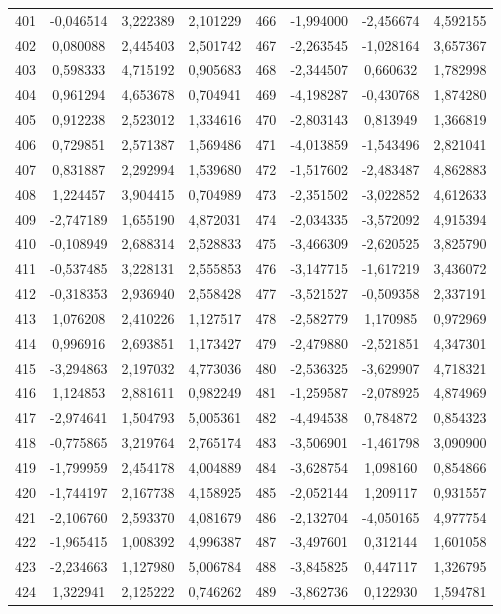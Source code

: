 \begin{apendicesenv}
\begin{table}[H]
\begin{tabular}{c c c c c c c c}
		401 & -0,046514 & 3,222389 & 2,101229 & 466 & -1,994000 & -2,456674 & 4,592155 \\
		402 & 0,080088 & 2,445403 & 2,501742 & 467 & -2,263545 & -1,028164 & 3,657367 \\
		403 & 0,598333 & 4,715192 & 0,905683 & 468 & -2,344507 & 0,660632 & 1,782998 \\
		404 & 0,961294 & 4,653678 & 0,704941 & 469 & -4,198287 & -0,430768 & 1,874280 \\
		405 & 0,912238 & 2,523012 & 1,334616 & 470 & -2,803143 & 0,813949 & 1,366819 \\
		406 & 0,729851 & 2,571387 & 1,569486 & 471 & -4,013859 & -1,543496 & 2,821041 \\
		407 & 0,831887 & 2,292994 & 1,539680 & 472 & -1,517602 & -2,483487 & 4,862883 \\
		408 & 1,224457 & 3,904415 & 0,704989 & 473 & -2,351502 & -3,022852 & 4,612633 \\
		409 & -2,747189 & 1,655190 & 4,872031 & 474 & -2,034335 & -3,572092 & 4,915394 \\
		410 & -0,108949 & 2,688314 & 2,528833 & 475 & -3,466309 & -2,620525 & 3,825790 \\
		411 & -0,537485 & 3,228131 & 2,555853 & 476 & -3,147715 & -1,617219 & 3,436072 \\
		412 & -0,318353 & 2,936940 & 2,558428 & 477 & -3,521527 & -0,509358 & 2,337191 \\
		413 & 1,076208 & 2,410226 & 1,127517 & 478 & -2,582779 & 1,170985 & 0,972969 \\
		414 & 0,996916 & 2,693851 & 1,173427 & 479 & -2,479880 & -2,521851 & 4,347301 \\
		415 & -3,294863 & 2,197032 & 4,773036 & 480 & -2,536325 & -3,629907 & 4,718321 \\
		416 & 1,124853 & 2,881611 & 0,982249 & 481 & -1,259587 & -2,078925 & 4,874969 \\
		417 & -2,974641 & 1,504793 & 5,005361 & 482 & -4,494538 & 0,784872 & 0,854323 \\
		418 & -0,775865 & 3,219764 & 2,765174 & 483 & -3,506901 & -1,461798 & 3,090900 \\
		419 & -1,799959 & 2,454178 & 4,004889 & 484 & -3,628754 & 1,098160 & 0,854866 \\
		420 & -1,744197 & 2,167738 & 4,158925 & 485 & -2,052144 & 1,209117 & 0,931557 \\
		421 & -2,106760 & 2,593370 & 4,081679 & 486 & -2,132704 & -4,050165 & 4,977754 \\
		422 & -1,965415 & 1,008392 & 4,996387 & 487 & -3,497601 & 0,312144 & 1,601058 \\
		423 & -2,234663 & 1,127980 & 5,006784 & 488 & -3,845825 & 0,447117 & 1,326795 \\
		424 & 1,322941 & 2,125222 & 0,746262 & 489 & -3,862736 & 0,122930 & 1,594781 \\
		\bottomrule
	\end{tabular}
\end{table}


\end{apendicesenv}
